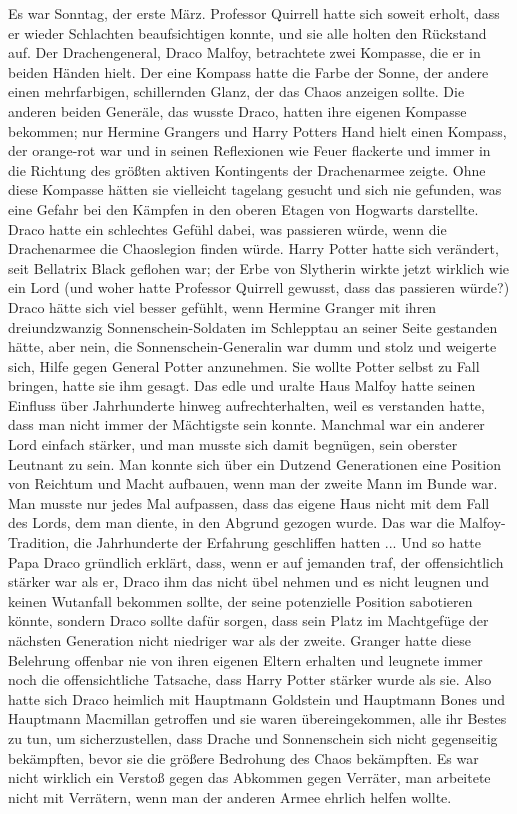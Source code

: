 Es war Sonntag, der erste März. Professor Quirrell hatte sich soweit erholt,
dass er wieder Schlachten beaufsichtigen konnte, und sie alle holten den
Rückstand auf. Der Drachengeneral, Draco Malfoy, betrachtete zwei Kompasse, die
er in beiden Händen hielt. Der eine Kompass hatte die Farbe der Sonne, der
andere einen mehrfarbigen, schillernden Glanz, der das Chaos anzeigen sollte.
Die anderen beiden Generäle, das wusste Draco, hatten ihre eigenen Kompasse
bekommen; nur Hermine Grangers und Harry Potters Hand hielt einen Kompass, der
orange-rot war und in seinen Reflexionen wie Feuer flackerte und immer in die
Richtung des größten aktiven Kontingents der Drachenarmee zeigte. Ohne diese
Kompasse hätten sie vielleicht tagelang gesucht und sich nie gefunden, was eine
Gefahr bei den Kämpfen in den oberen Etagen von Hogwarts darstellte. Draco hatte
ein schlechtes Gefühl dabei, was passieren würde, wenn die Drachenarmee die
Chaoslegion finden würde. Harry Potter hatte sich verändert, seit Bellatrix
Black geflohen war; der Erbe von Slytherin wirkte jetzt wirklich wie ein Lord
(und woher hatte Professor Quirrell gewusst, dass das passieren würde?) Draco
hätte sich viel besser gefühlt, wenn Hermine Granger mit ihren dreiundzwanzig
Sonnenschein-Soldaten im Schlepptau an seiner Seite gestanden hätte, aber nein,
die Sonnenschein-Generalin war dumm und stolz und weigerte sich, Hilfe gegen
General Potter anzunehmen. Sie wollte Potter selbst zu Fall bringen, hatte sie
ihm gesagt. Das edle und uralte Haus Malfoy hatte seinen Einfluss über
Jahrhunderte hinweg aufrechterhalten, weil es verstanden hatte, dass man nicht
immer der Mächtigste sein konnte. Manchmal war ein anderer Lord einfach stärker,
und man musste sich damit begnügen, sein oberster Leutnant zu sein. Man konnte
sich über ein Dutzend Generationen eine Position von Reichtum und Macht
aufbauen, wenn man der zweite Mann im Bunde war. Man musste nur jedes Mal
aufpassen, dass das eigene Haus nicht mit dem Fall des Lords, dem man diente, in
den Abgrund gezogen wurde. Das war die Malfoy-Tradition, die Jahrhunderte der
Erfahrung geschliffen hatten ... Und so hatte Papa Draco gründlich erklärt,
dass, wenn er auf jemanden traf, der offensichtlich stärker war als er, Draco
ihm das nicht übel nehmen und es nicht leugnen und keinen Wutanfall bekommen
sollte, der seine potenzielle Position sabotieren könnte, sondern Draco sollte
dafür sorgen, dass sein Platz im Machtgefüge der nächsten Generation nicht
niedriger war als der zweite. Granger hatte diese Belehrung offenbar nie von
ihren eigenen Eltern erhalten und leugnete immer noch die offensichtliche
Tatsache, dass Harry Potter stärker wurde als sie. Also hatte sich Draco
heimlich mit Hauptmann Goldstein und Hauptmann Bones und Hauptmann Macmillan
getroffen und sie waren übereingekommen, alle ihr Bestes zu tun, um
sicherzustellen, dass Drache und Sonnenschein sich nicht gegenseitig bekämpften,
bevor sie die größere Bedrohung des Chaos bekämpften. Es war nicht wirklich ein
Verstoß gegen das Abkommen gegen Verräter, man arbeitete nicht mit Verrätern,
wenn man der anderen Armee ehrlich helfen wollte.

